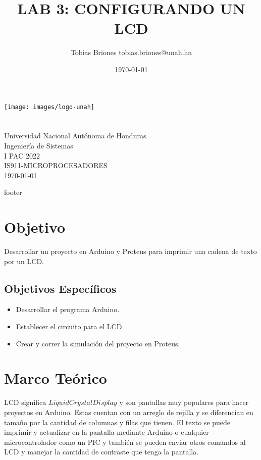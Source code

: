 \documentclass{article}
\title{LAB 3: CONFIGURANDO UN LCD}
\author{Tobias Briones \bigbreak tobias.briones@unah.hn}
\date{\today}
\begin{document}
    \makeatletter
    \begin{titlepage}
        \begin{center}
            \texttt{[image: images/logo-unah]}\\[4ex]
            {\huge \bfseries \@title
            \vspace{1cm}}\\[2ex]
            {\LARGE \@author}\\[50ex]

            {\large
            Universidad Nacional Autónoma de Honduras\\
            Ingeniería de Sistemas\\
            I PAC 2022\\
            IS911-MICROPROCESADORES
            }\\[2ex]

            {\large \today}
        \end{center}
    \end{titlepage}
    \makeatother
    \thispagestyle{empty}
    \newpage

    {footer}

    \section{Objetivo}

    Desarrollar un proyecto en Arduino y Proteus para imprimir una cadena de
    texto por un LCD\@.

    \subsection{Objetivos Específicos}\label{subsec:objetivos-específicos}

    \begin{itemize}
        \item Desarrollar el programa Arduino.
        \item Establecer el circuito para el LCD.
        \item Crear y correr la simulación del proyecto en Proteus.
    \end{itemize}

    \section{Marco Teórico}\label{sec:marco-teórico}

    LCD significa $Liquid Crystal Display$ y son pantallas muy populares para
    hacer proyectos en Arduino. Estas cuentan con un arreglo de rejilla y se
    diferencian en tamaño por la cantidad de columnas y filas que tienen. El
    texto se puede imprimir y actualizar en la pantalla mediante Arduino o
    cualquier microcontrolador como un PIC y también se pueden enviar otros
    comandos al LCD y manejar la cantidad de contraste que tenga la pantalla.
\end{document}
